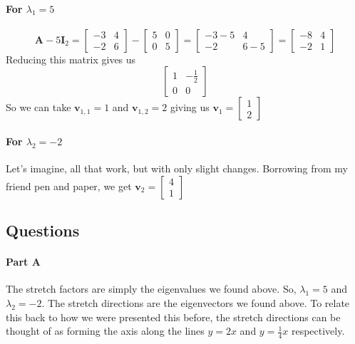 \documentclass{article}
\begin{document}
            \paragraph{For $\lambda_1=5$}
                \[
                    \mathbf{A}-5\mathbf{I}_2
                    =
                    \begin{bmatrix}-3 & 4\\-2 & 6\end{bmatrix}
                    -
                    \begin{bmatrix}5 & 0\\0 & 5\end{bmatrix}
                    =
                    \begin{bmatrix}-3-5 & 4\\-2 & 6-5\end{bmatrix}
                    =
                    \begin{bmatrix}-8 & 4\\-2 & 1\end{bmatrix}
                \]
                Reducing this matrix gives us
                \[
                    \begin{bmatrix}1 & -\frac{1}{2}\\0 & 0\end{bmatrix}
                \]
                So we can take $\mathbf{v}_{1,1}=1$ and $\mathbf{v}_{1,2}=2$ 
                giving us $\mathbf{v}_1=\begin{bmatrix}1\\2\end{bmatrix}$
            \paragraph{For $\lambda_2=-2$}
                Let's imagine, all that work, but with only slight changes.
                Borrowing from my friend pen and paper, we get
                $\mathbf{v}_2=\begin{bmatrix}4\\1\end{bmatrix}$
        \subsection{Questions}
            \paragraph{Part A}
                The stretch factors are simply the eigenvalues we found above.
                So, $\lambda_1=5$ and $\lambda_2=-2$. The stretch directions
                are the eigenvectors we found above.
                To relate this back to how we were presented this before,
                the stretch directions can be thought of as forming the axis
                along the lines $y=2x$ and $y=\frac{1}{4}x$ respectively.
\end{document}
